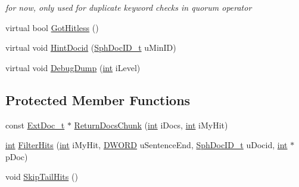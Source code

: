 \begin{DoxyCompactItemize}
\begin{DoxyCompactList}\small\item\em for now, only used for duplicate keyword checks in quorum operator \end{DoxyCompactList}\item 
virtual bool \hyperlink{classExtUnit__c_a028b82c1ff7bf5b1bd675992a41faf6c}{Got\-Hitless} ()
\item 
virtual void \hyperlink{classExtUnit__c_a8c666ac57a6e9d70dd76e84d56c8efa7}{Hint\-Docid} (\hyperlink{sphinx_8h_a3176771631c12a9e4897272003e6b447}{Sph\-Doc\-I\-D\-\_\-t} u\-Min\-I\-D)
\item 
virtual void \hyperlink{classExtUnit__c_a23deb2f56f86fe73f6f7cf84a6e77d6d}{Debug\-Dump} (\hyperlink{sphinxexpr_8cpp_a4a26e8f9cb8b736e0c4cbf4d16de985e}{int} i\-Level)
\end{DoxyCompactItemize}
\subsection*{Protected Member Functions}
\begin{DoxyCompactItemize}
\item 
const \hyperlink{structExtDoc__t}{Ext\-Doc\-\_\-t} $\ast$ \hyperlink{classExtUnit__c_a7789332b1f25dba0f684966c46e598e9}{Return\-Docs\-Chunk} (\hyperlink{sphinxexpr_8cpp_a4a26e8f9cb8b736e0c4cbf4d16de985e}{int} i\-Docs, \hyperlink{sphinxexpr_8cpp_a4a26e8f9cb8b736e0c4cbf4d16de985e}{int} i\-My\-Hit)
\item 
\hyperlink{sphinxexpr_8cpp_a4a26e8f9cb8b736e0c4cbf4d16de985e}{int} \hyperlink{classExtUnit__c_a2b955c13540736abba3694fcbfa8a5c2}{Filter\-Hits} (\hyperlink{sphinxexpr_8cpp_a4a26e8f9cb8b736e0c4cbf4d16de985e}{int} i\-My\-Hit, \hyperlink{sphinxstd_8h_a798af1e30bc65f319c1a246cecf59e39}{D\-W\-O\-R\-D} u\-Sentence\-End, \hyperlink{sphinx_8h_a3176771631c12a9e4897272003e6b447}{Sph\-Doc\-I\-D\-\_\-t} u\-Docid, \hyperlink{sphinxexpr_8cpp_a4a26e8f9cb8b736e0c4cbf4d16de985e}{int} $\ast$p\-Doc)
\item 
void \hyperlink{classExtUnit__c_a68bac2570421f689792eaf3763865316}{Skip\-Tail\-Hits} ()
\end{DoxyCompactItemize}
